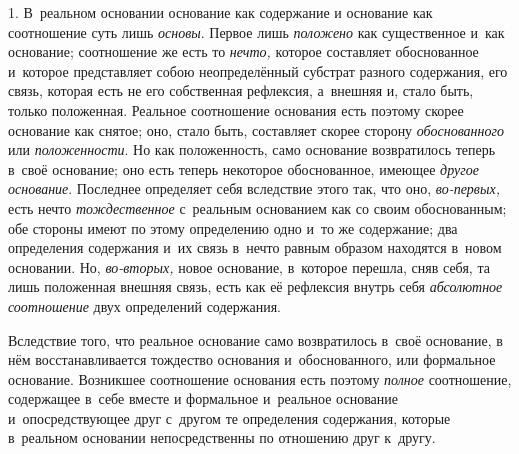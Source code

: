 
1. В~реальном основании основание как содержание
и основание как соотношение суть лишь {\em основы}.
Первое лишь {\em положено} как существенное и~как
основание; соотношение же есть то {\em нечто,} которое
составляет обоснованное и~которое представляет собою неопределённый
субстрат разного содержания, его связь, которая есть не его собственная
рефлексия, а~внешняя и, стало быть, только положенная. Реальное соотношение
основания есть поэтому скорее основание как снятое; оно, стало быть,
составляет скорее сторону {\em обоснованного} или
{\em положенности}. Но как положенность, само основание
возвратилось теперь в~своё основание; оно есть теперь некоторое
обоснованное, имеющее {\em другое основание}. Последнее
определяет себя вследствие этого так, что оно,
{\em во-первых,} есть нечто
{\em тождественное} с~реальным основанием как со своим
обоснованным; обе стороны имеют по этому определению одно и~то же
содержание; два определения содержания и~их связь в~нечто равным образом
находятся в~новом основании. Но, {\em во-вторых,} новое
основание, в~которое перешла, сняв себя, та лишь положенная внешняя связь,
есть как её рефлексия внутрь себя {\em абсолютное
соотношение} двух определений содержания.

Вследствие того, что реальное основание само возвратилось в~своё основание,
в нём восстанавливается тождество основания и~обоснованного, или формальное
основание. Возникшее соотношение основания есть поэтому
{\em полное} соотношение, содержащее в~себе вместе и
формальное и~реальное основание и~опосредствующее друг с~другом те
определения содержания, которые в~реальном основании непосредственны по
отношению друг к~другу.

